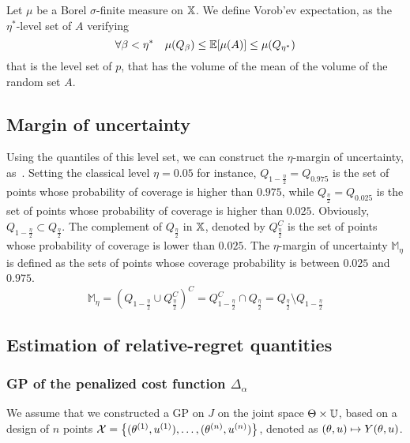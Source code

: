 \documentclass[../../Main_ManuscritThese.tex]{subfiles}
\begin{document}
Let $\mu$ be a Borel $\sigma$-finite measure on $\mathbb{X}$. We define Vorob'ev expectation, as the $\eta^*$-level set of $A$ verifying
\begin{equation}
  \forall \beta < \eta^* \quad \mu(Q_{\beta}) \leq \mathbb{E}[\mu(A)] \leq \mu(Q_{\eta^*})
\end{equation}
that is the level set of $p$, that has the volume of the mean of the volume of the random set $A$.

\subsection{Margin of uncertainty}
\label{sec:margin_of_uncertainty}
Using the quantiles of this level set, we can construct the $\eta$-margin of uncertainty, as~\cite{dubourg_reliability-based_2011}.
Setting the classical level $\eta=0.05$ for instance, $Q_{1-\frac{\eta}{2}}=Q_{0.975}$ is the set of points whose probability of coverage is higher than $0.975$, while $Q_{\frac{\eta}{2}}=Q_{0.025}$ is the set of points whose probability of coverage is higher than $0.025$. Obviously, $Q_{1-\frac{\eta}{2}} \subset Q_{\frac{\eta}{2}}$. The complement of $Q_{\frac{\eta}{2}}$ in $\mathbb{X}$, denoted by $Q_{\frac{\eta}{2}}^C$ is the set of points whose probability of coverage is lower than $0.025$. The $\eta$-margin of uncertainty $\mathbb{M}_{\eta}$ is defined as the sets of points whose coverage probability is between $0.025$ and $0.975$.
\begin{equation*}
  \mathbb{M}_{\eta} = \left(Q_{1-\frac{\eta}{2}} \cup Q^C_{\frac{\eta}{2}} \right)^C = Q_{1-\frac{\eta}{2}}^C \cap Q_{\frac{\eta}{2}} = Q_{\frac{\eta}{2}} \setminus Q_{1-\frac{\eta}{2}}
\end{equation*}






\subsection{Estimation of relative-regret quantities}
\subsubsection{GP of the penalized cost function $\Delta_{\alpha}$}
\label{ssec:gp_delta_alpha}
We assume that we constructed a GP on $J$ on the joint space $\Theta \times \mathbb{U}$, based on a design of $n$ points $\mathcal{X} = \left\{(\theta^{(1)},u^{(1)}),\dots,(\theta^{(n)},u^{(n)}) \right\}$, denoted as $(\theta,u)\mapsto Y(\theta,u)$.
\end{document}
